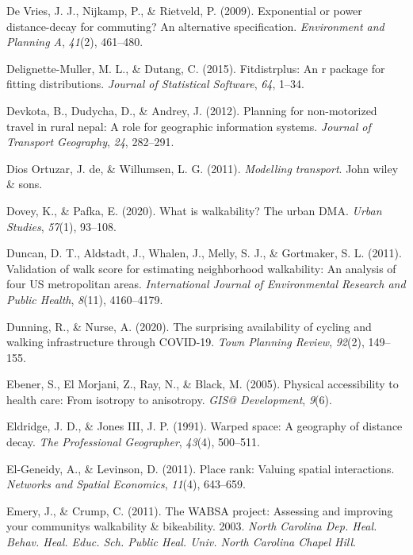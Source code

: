 \documentclass[
11pt, %
oneside, %
english, %
singlespacing, %
]{macthesis} %
\newlength{\cslhangindent}
\newenvironment{CSLReferences}[2] %
{\begin{list}{}{%
	\setlength{\itemindent}{0pt}
	\setlength{\leftmargin}{0pt}
	\setlength{\parsep}{0pt}
	\ifodd #1
	\setlength{\leftmargin}{\cslhangindent}
	\setlength{\itemindent}{-1\cslhangindent}
	\fi
	\setlength{\itemsep}{#2\baselineskip}}}
{\end{list}}
\begin{document}
\begin{CSLReferences}{1}{0}
De Vries, J. J., Nijkamp, P., \& Rietveld, P. (2009). Exponential or power distance-decay for commuting? An alternative specification. \emph{Environment and Planning A}, \emph{41}(2), 461--480.

Delignette-Muller, M. L., \& Dutang, C. (2015). Fitdistrplus: An r package for fitting distributions. \emph{Journal of Statistical Software}, \emph{64}, 1--34.

Devkota, B., Dudycha, D., \& Andrey, J. (2012). Planning for non-motorized travel in rural nepal: A role for geographic information systems. \emph{Journal of Transport Geography}, \emph{24}, 282--291.

Dios Ortuzar, J. de, \& Willumsen, L. G. (2011). \emph{Modelling transport}. John wiley \& sons.

Dovey, K., \& Pafka, E. (2020). What is walkability? The urban DMA. \emph{Urban Studies}, \emph{57}(1), 93--108.

Duncan, D. T., Aldstadt, J., Whalen, J., Melly, S. J., \& Gortmaker, S. L. (2011). Validation of walk score for estimating neighborhood walkability: An analysis of four US metropolitan areas. \emph{International Journal of Environmental Research and Public Health}, \emph{8}(11), 4160--4179.

Dunning, R., \& Nurse, A. (2020). The surprising availability of cycling and walking infrastructure through COVID-19. \emph{Town Planning Review}, \emph{92}(2), 149--155.

Ebener, S., El Morjani, Z., Ray, N., \& Black, M. (2005). Physical accessibility to health care: From isotropy to anisotropy. \emph{GIS@ Development}, \emph{9}(6).

Eldridge, J. D., \& Jones III, J. P. (1991). Warped space: A geography of distance decay. \emph{The Professional Geographer}, \emph{43}(4), 500--511.

El-Geneidy, A., \& Levinson, D. (2011). Place rank: Valuing spatial interactions. \emph{Networks and Spatial Economics}, \emph{11}(4), 643--659.

Emery, J., \& Crump, C. (2011). The WABSA project: Assessing and improving your communitys walkability \& bikeability. 2003. \emph{North Carolina Dep. Heal. Behav. Heal. Educ. Sch. Public Heal. Univ. North Carolina Chapel Hill}.


\end{CSLReferences}
\end{document}
